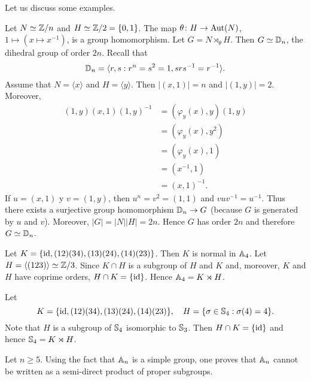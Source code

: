 
Let us discuss some examples. 

\begin{example}
Let $N\simeq \mathbb{Z}/n$ and $H\simeq\mathbb{Z}/2=\{0,1\}$. The map $\theta\colon H\to\operatorname{Aut}(N)$, 
$1\mapsto (x\mapsto x^{-1})$, is a group homomorphism. Let $G=N\rtimes_\theta H$.
Then $G\simeq\mathbb{D}_n$, the dihedral group of order $2n$.
Recall that 
\[
\mathbb{D}_n=\langle r,s:r^n=s^2=1, srs^{-1}=r^{-1}\rangle.
\]
Assume that $N=\langle x\rangle$ and $H=\langle y\rangle$. Then $|(x,1)|=n$ and $|(1,y)|=2$. 
Moreover,
\begin{align*}
(1,y)(x,1)(1,y)^{-1} &= (\varphi_y(x),y)(1,y)\\
&=(\varphi_y(x),y^2)\\
&=(\varphi_y(x),1)\\
&=(x^{-1},1)\\
&=(x,1)^{-1}.
\end{align*}
If $u=(x,1)$ y $v=(1,y)$, then $u^n=v^2=(1,1)$ and $vuv^{-1}=u^{-1}$. Thus there exists 
a surjective group homomorphism 
$\mathbb{D}_n\to G$ (because $G$ is generated by $u$ and $v$). Moreover, $|G|=|N||H|=2n$. Hence 
$G$ has order $2n$ and therefore $G\simeq\mathbb{D}_n$.
\end{example}

\begin{example}
Let $K=\{\operatorname{id},(12)(34),(13)(24),(14)(23)\}$. Then $K$ is normal in $\mathbb{A}_4$. 
Let $H=\langle (123)\rangle\simeq\mathbb{Z}/3$. Since $K\cap H$ is a subgroup of $H$ and $K$ and, moreover, 
$K$ and $H$ have coprime orders, $H\cap K=\{\operatorname{id}\}$. Hence $\mathbb{A}_4=K\rtimes H$.
\end{example}

\begin{example}
Let 
\[
K=\{\operatorname{id},(12)(34),(13)(24),(14)(23)\},\quad  
H=\{\sigma\in\mathbb{S}_4:\sigma(4)=4\}.
\]
Note that $H$ is a subgroup of 
$\mathbb{S}_4$ isomorphic to $\mathbb{S}_3$. Then $H\cap K=\{\operatorname{id}\}$ and hence 
$\mathbb{S}_4=K\rtimes H$.
\end{example}

Let $n\geq5$. 
Using the fact that $\mathbb{A}_n$ is a simple group,  
one proves that $\mathbb{A}_n$ cannot be written as a semi-direct product of proper subgroups. 

